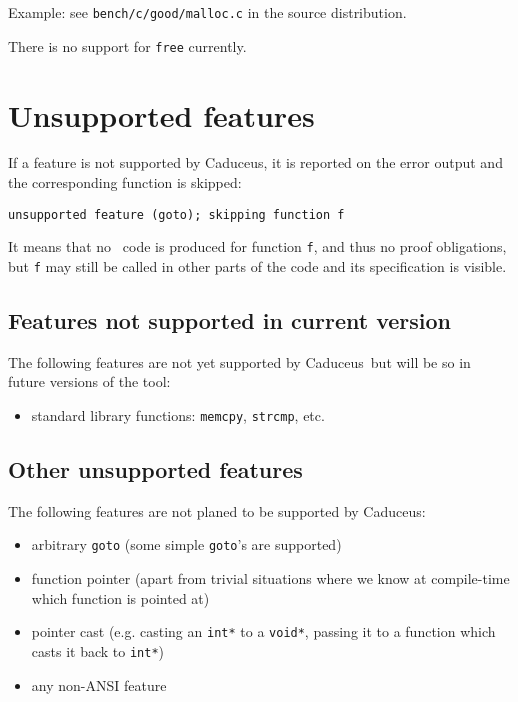 \documentclass[12pt,a4paper,twoside,openright]{report}
\newcommand{\caduceus}{\textsf{Caduceus}}
\begin{document}
Example: see \texttt{bench/c/good/malloc.c} in the source distribution.

There is no support for \texttt{free} currently.

\section{Unsupported features}

If a feature is not supported by \caduceus, it is reported on the
error output and the corresponding function is skipped:
\begin{verbatim}
unsupported feature (goto); skipping function f
\end{verbatim}
It means that no \why\ code is produced for function \texttt{f}, and
thus no proof obligations, but \texttt{f} may still be called in other
parts of the code and its specification is visible.

\subsection{Features not supported in current version}
The following features are not yet supported by \caduceus\ but will be
so in future versions of the tool:
\begin{itemize}
\item standard library functions: \texttt{memcpy},
  \texttt{strcmp}, etc.
\end{itemize}

\subsection{Other unsupported features}
The following features are not planed to be supported by \caduceus:
\begin{itemize}
\item arbitrary \texttt{goto} (some simple \texttt{goto}'s are supported)
\item function pointer (apart from trivial situations where we know at
  compile-time which function is pointed at)
\item pointer cast (e.g. casting an \texttt{int*} to a \texttt{void*},
  passing it to a function which casts it back to \texttt{int*})
\item any non-ANSI feature
\end{itemize}



\nocite{*}




\tableofcontents

{}
\printindex
\end{document}
